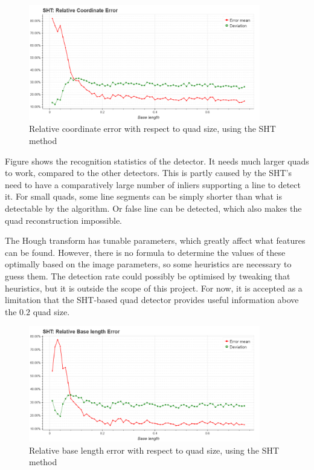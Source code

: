 \begin{figure}[ht]
	\centering
	\includegraphics[width=0.9\textwidth]{figures/plots/sht_relative_coordinate_error.png}
	\caption{Relative coordinate error with respect to quad size, using the SHT method}
	\label{fig:shtRelCoordErr}
\end{figure}
Figure  shows the recognition statistics of the detector.
It needs much larger quads to work, compared to the other detectors.
This is partly caused by the SHT's need to have a comparatively large number of inliers supporting a line to detect it.
For small quads, some line segments can be simply shorter than what is detectable by the algorithm.
Or false line can be detected, which also makes the quad reconstruction impossible.

The Hough transform has tunable parameters, which greatly affect what features can be found.
However, there is no formula to determine the values of these optimally based on the image parameters, so some heuristics are necessary to guess them.
The detection rate could possibly be optimised by tweaking that heuristics, but it is outside the scope of this project.
For now, it is accepted as a limitation that the SHT-based quad detector provides useful information above the $0.2$ quad size.
\begin{figure}[ht]
	\centering
	\includegraphics[width=0.9\textwidth]{figures/plots/sht_relative_base_length_error.png}
	\caption{Relative base length error with respect to quad size, using the SHT method}
	\label{fig:shtRelBaseErr}
\end{figure}

